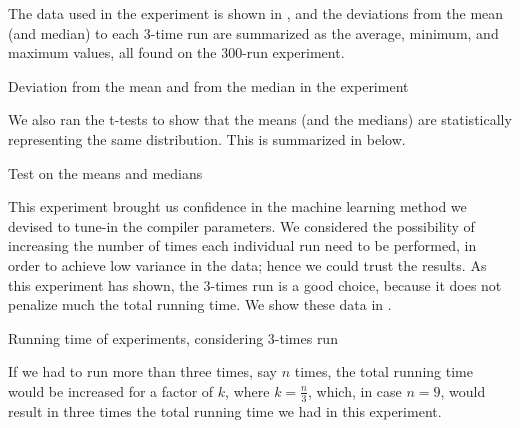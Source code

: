 The data used in the experiment is shown in , and the deviations from the mean (and median) to each $3$-time run are summarized as the average, minimum, and maximum values, all found on the $300$-run experiment.

\begin{table}
  \centering
  \begin{tiny}
  
  \end{tiny}
  \caption{Deviation from the mean and from the median in the experiment}
  \label{tab:simStats}
\end{table}

We also ran the t-tests to show that the means (and the medians) are statistically representing the same distribution. This is summarized in  below.

\begin{table}
  \centering
  \begin{tiny}
  
  \end{tiny}
  \caption{Test on the means and medians}
  \label{tab:statTest}
\end{table}

This experiment brought us confidence in the machine learning method we devised to tune-in the compiler parameters. We considered the possibility of increasing the number of times each individual run need to be performed, in order to achieve low variance in the data; hence we could trust the results. As this experiment has shown, the $3$-times run is a good choice, because it does not penalize much the total running time. We show these data in .

\begin{table}
  \centering
  \begin{tiny}
  
  \end{tiny}
  \caption{Running time of experiments, considering $3$-times run}
  \label{tab:runTime}
\end{table}

If we had to run more than three times, say $n$ times, the total running time would be increased for a factor of $k$, where $k = \frac{n}{3}$, which, in case $n = 9$, would result in three times the total running time we had in this experiment.
